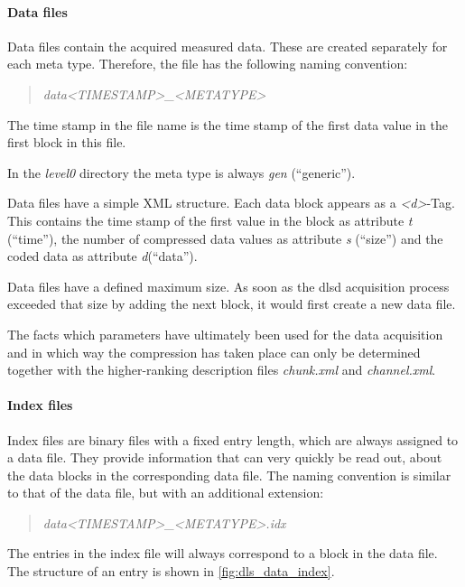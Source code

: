\documentclass[a4paper,12pt,BCOR6mm,bibtotoc,idxtotoc]{scrbook}
\begin{document}
\paragraph{Data files} Data files contain the acquired measured data. These are created separately for each meta type. Therefore, the file has the following naming convention:

\begin{quote} \textit{data\textless TIMESTAMP\textgreater\_\textless METATYPE\textgreater} \end{quote}

The time stamp in the file name is the time stamp of the first data value in the first block in this file.

In the \textit{level0} directory the meta type is always \textit{gen} (``generic'').

Data files have a simple XML structure. Each data block appears as a \textit{\textless d\textgreater}-Tag. This contains the time stamp of the first value in the block as attribute \textit{t} (``time''), the number of compressed data values as attribute \textit{s} (``size'') and the coded data as attribute \textit{d}(``data'').

Data files have a defined maximum size. As soon as the dlsd acquisition process exceeded that size by adding the next block, it would first create a new data file.

The facts which parameters have ultimately been used for the data acquisition and in which way the compression has taken place can only be determined together with the higher-ranking description files \textit{chunk.xml} and \textit{channel.xml}.

\paragraph{Index files} Index files are binary files with a fixed entry length, which are always assigned to a data file. They provide information that can very quickly be read out, about the data blocks in the corresponding data file. The naming convention is similar to that of the data file, but with an additional extension:

\begin{quote} \textit{data\textless TIMESTAMP\textgreater\_\textless METATYPE\textgreater.idx} \end{quote}

The entries in the index file will always correspond to a block in the data
file. The structure of an entry is shown in \autoref{fig:dls_data_index}.
\end{document}
